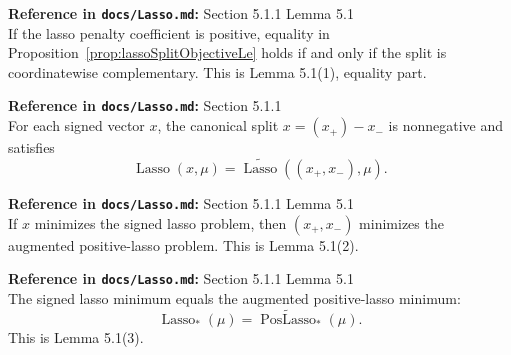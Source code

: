 \begin{proposition}\label{prop:lassoSplitObjectiveEq}
  \textbf{Reference in \texttt{docs/Lasso.md}:} Section 5.1.1 Lemma 5.1\\
If the lasso penalty coefficient is positive, equality in
Proposition~\ref{prop:lassoSplitObjectiveLe} holds if and only if the split is
coordinatewise complementary.
This is Lemma 5.1(1), equality part.
\end{proposition}

\begin{proposition}\label{prop:lassoObjectiveReduction}
  \textbf{Reference in \texttt{docs/Lasso.md}:} Section 5.1.1\\
For each signed vector \(x\), the canonical split \(x=(x_+)-x_-\) is
nonnegative and satisfies
\[
  \operatorname{Lasso}(x,\mu)
  =
  \widetilde{\operatorname{Lasso}}((x_+,x_-),\mu).
\]
\end{proposition}

\begin{proposition}\label{prop:lassoMinimizerTransfer}
  \textbf{Reference in \texttt{docs/Lasso.md}:} Section 5.1.1 Lemma 5.1\\
If \(x\) minimizes the signed lasso problem, then \((x_+,x_-)\) minimizes the
augmented positive-lasso problem.
This is Lemma 5.1(2).
\end{proposition}

\begin{proposition}\label{prop:lassoMinimumEquality}
  \textbf{Reference in \texttt{docs/Lasso.md}:} Section 5.1.1 Lemma 5.1\\
The signed lasso minimum equals the augmented positive-lasso minimum:
\[
  \operatorname{Lasso}_*(\mu)
  =
  \widetilde{\operatorname{PosLasso}}_*(\mu).
\]
This is Lemma 5.1(3).
\end{proposition}

